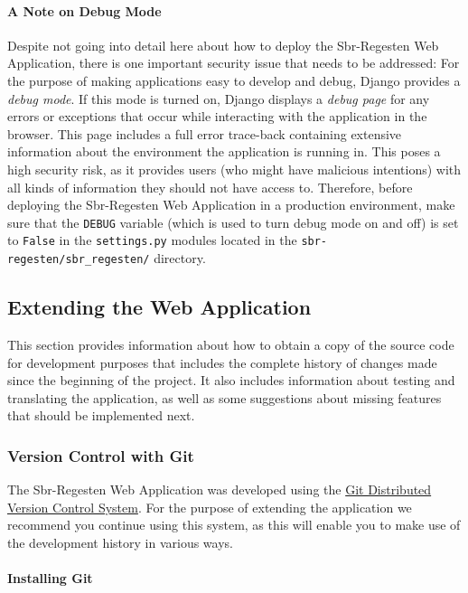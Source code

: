 \paragraph{A Note on Debug Mode}

Despite not going into detail here about how to deploy the
Sbr-Regesten Web Application, there is one important security issue
that needs to be addressed: For the purpose of making applications
easy to develop and debug, Django provides a \emph{debug mode}. If
this mode is turned on, Django displays a \emph{debug page} for any
errors or exceptions that occur while interacting with the application
in the browser. This page includes a full error trace-back containing
extensive information about the environment the application is running
in. This poses a high security risk, as it provides users (who might
have malicious intentions) with all kinds of information they should
not have access to. Therefore, before deploying the Sbr-Regesten Web
Application in a production environment, make sure that the
\texttt{DEBUG} variable (which is used to turn debug mode on and off)
is set to \texttt{False} in the \texttt{settings.py} modules located
in the \texttt{sbr-regesten/sbr\_regesten/} directory.

\subsection{Extending the Web Application}
\label{sec:extend}

This section provides information about how to obtain a copy of the
source code for development purposes that includes the complete
history of changes made since the beginning of the project. It also
includes information about testing and translating the application, as
well as some suggestions about missing features that should be
implemented next.

\subsubsection{Version Control with Git}
\label{sec:git}

The Sbr-Regesten Web Application was developed using the
\href{http://git-scm.com/}{Git Distributed Version Control System}.
For the purpose of extending the application we recommend you continue
using this system, as this will enable you to make use of the
development history in various ways.

\paragraph{Installing Git}

